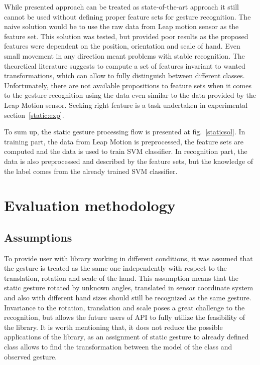 While presented approach can be treated as state-of-the-art approach it still cannot be used without defining proper feature sets for gesture recognition.
The naive solution would be to use the raw data from Leap motion sensor as the feature set.
This solution was tested, but provided poor results as the proposed features were dependent on the position, orientation and scale of hand. 
Even small movement in any direction meant problems with stable recognition. 
The theoretical literature suggests to compute a set of features invariant to wanted transformations, which can allow to fully distinguish between different classes.
Unfortunately, there are not available propositions to feature sets when it comes to the gesture recognition using the data even similar to the data provided by the Leap Motion sensor.
Seeking right feature is a task undertaken in experimental section~\ref{static:exp}.

To sum up, the static gesture processing flow is presented at fig.~\ref{staticsol}. In training part, the data from Leap Motion is preprocessed, the feature sets are computed and the data is used to train SVM classifier.
In recognition part, the data is also preprocessed and described by the feature sets, but the knowledge of the label comes from the already trained SVM classifier.


\section{Evaluation methodology}

\subsection{Assumptions}
To provide user with library working in different conditions, it was assumed that the gesture is treated as the same one independently with respect to the translation, rotation and scale of the hand. 
This assumption means that the static gesture rotated by unknown angles, translated in sensor coordinate system and also with different hand sizes should still be recognized as the same gesture.
Invariance to the rotation, translation and scale poses a great challenge to the recognition, but allows the future users of API to fully utilize the feasibility of the library.
It is worth mentioning that, it does not reduce the possible applications of the library, as an assignment of static gesture to already defined class allows to find the transformation between the model of the class and observed gesture.


